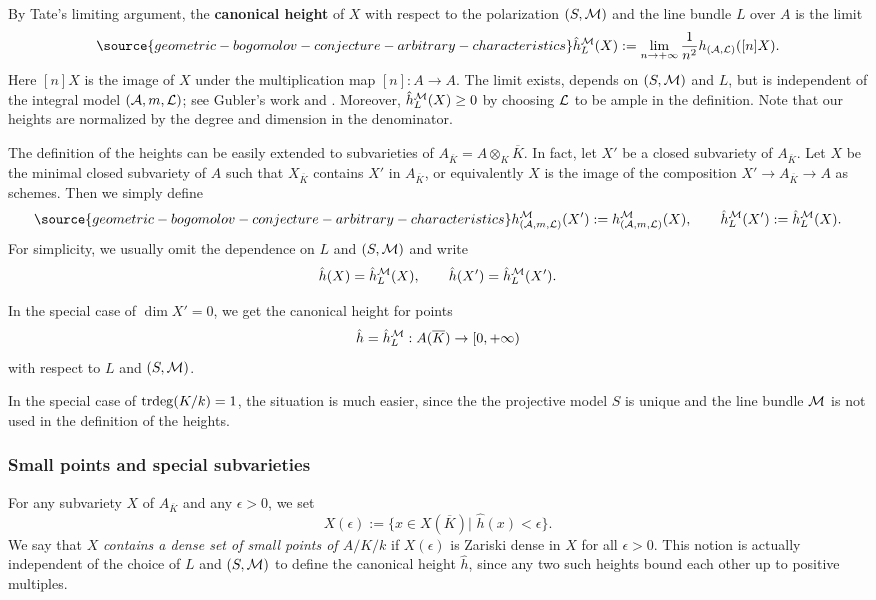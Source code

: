 By Tate's limiting argument, the {\bf{canonical height}} of $X$ with respect to the polarization $(S,{\mathcal M})$
and the line bundle $L$ over $A$ is the limit
\begin{equation}\label{eq:ntlimit}
\source{geometric-bogomolov-conjecture-arbitrary-characteristics}
\hat{h}_L^{\sM}(X)
:=\lim_{n\to +\infty} \frac{1}{n^2}h_{(\sA,\sL)}([n]X).
\end{equation}
Here $[n]X$ is the image of $X$ under the multiplication map $[n]:A\to A$.
The limit exists, depends on $(S,{\mathcal M})$ and $L$, but is independent of the integral model $({\mathcal A}, m, {\mathcal L})$; see Gubler's work \cite[Theorem 3.6]{Gubler2007} and \cite[Theorem 11.18]{Gubler:Pisa03}.
Moreover, $\hat{h}_L^{{\mathcal M}}(X)\geq0$ by choosing ${\mathcal L}$ to be ample in the definition.
Note that our heights are normalized by the degree and dimension in the denominator.

The definition of the heights can be easily extended to subvarieties of $A_{\overline{K}}=A\otimes_K\overline{K}$. In fact, let $X'$ be a closed subvariety of $A_{\overline{K}}$.
Let $X$ be the minimal closed subvariety of $A$ such that $X_{\overline K}$ contains $X'$ in $A_{\overline{K}}$, or equivalently $X$ is the image of the composition
$X'\to A_{\overline{K}}\to A$ as schemes.
Then we simply define
\begin{equation}\label{eq:ntlimit}
\source{geometric-bogomolov-conjecture-arbitrary-characteristics}
h_{(\sA,m,\sL)}^{\sM}(X')
:=h_{(\sA,m,\sL)}^{\sM}(X),\qquad
\hat{h}_L^{\sM}(X')
:=\hat{h}_L^{\sM}(X).
\end{equation}
For simplicity, we usually omit the dependence on $L$ and $(S,{\mathcal M})$ and write
$$\hat{h}(X)=\hat{h}_L^{{\mathcal M}}(X),\qquad
\hat{h}(X')=\hat{h}_L^{{\mathcal M}}(X').$$

In the special case of $\dim X'=0$, we get the canonical height  for points
$$\hat{h}=\hat{h}_L^{{\mathcal M}}:A(\overline{K})\to [0,+\infty)$$
with respect to $L$ and $(S,{\mathcal M})$.

In the special case of ${\mathrm{trdeg}}(K/k)=1$, the situation is much easier, since the the projective model $S$ is unique and the line bundle ${\mathcal M}$ is not used in the definition of the heights.


\subsubsection{Small points and special subvarieties}
For any subvariety $X$ of  $A_{\overline{K}}$ and any $\epsilon> 0$, we set
\begin{equation}
X(\epsilon):=\{x\in X(\overline{K})|\,\, \hat{h}(x)<\epsilon\}.
\end{equation}
We say that $X$ \emph{contains a dense set of small points of $A/K/k$} if $X(\epsilon)$ is Zariski dense in $X$ for all $\epsilon >0$.
This notion is actually independent of the choice of $L$ and $(S,{\mathcal M})$ to define the canonical height $\hat h$, since any two such heights bound each other up to positive  multiples.

